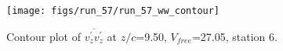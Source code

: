 \begin{figure}[H]
\centering
\texttt{[image: figs/run\_57/run\_57\_ww\_contour]}
\caption{Contour plot of $\overline{v_{z}^{\prime} v_{z}^{\prime}}$ at $z/c$=9.50, $V_{free}$=27.05, station 6.}
\label{fig:run_57_ww_contour}
\end{figure}


